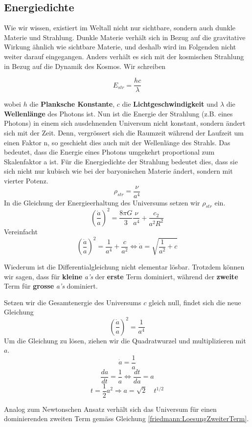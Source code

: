 \begin{refsection}
\subsection*{Energiedichte}
Wie wir wissen, existiert im Weltall nicht nur sichtbare, sondern auch dunkle Materie und Strahlung. Dunkle Materie verhält sich in Bezug auf die gravitative Wirkung ähnlich wie sichtbare Materie, und deshalb wird im Folgenden nicht weiter darauf eingegangen.
Anders verhält es sich mit der kosmischen Strahlung in Bezug auf die Dynamik des Kosmos. Wir schreiben


\[ E_{str} = \frac{h c}{\lambda} \]

wobei $h$ die \textbf{Planksche Konstante}, $c$ die \textbf{Lichtgeschwindigkeit} und $\lambda$ die \textbf{Wellenlänge} des Photons ist.
Nun ist die Energie der Strahlung (z.B. eines Photons) in einem sich ausdehnenden Universum nicht konstant, sondern ändert sich mit der Zeit. 
Denn, vergrössert sich die Raumzeit während der Laufzeit um einen Faktor n, so geschieht dies auch mit der Wellenlänge des Strahls.
Das bedeutet, dass die Energie eines Photons umgekehrt proportional zum Skalenfaktor a ist. Für die Energiedichte der Strahlung bedeutet dies, dass sie sich nicht nur kubisch wie bei der baryonischen Materie ändert, sondern mit vierter Potenz.
\begin{equation}
\rho_{str} = \frac{\nu}{a^4}
\end{equation}
In die Gleichung der Energieerhaltung des Universums setzen wir $\rho_{str}$ ein.
\[
\left(\frac{\dot{a}}{a} \right)^2 = \frac{8 \pi G}{3} \frac{\nu}{a^4} + \frac{c_2}{a^2 R^2}
\]
Vereinfacht
\[
\left(\frac{\dot{a}}{a} \right)^2 = \frac{1}{a^4} + \frac{c}{a^2} \Leftrightarrow \dot{a} = \sqrt{\frac{1}{a^2} + c}
\]

Wiederum ist die Differentialgleichung nicht elementar lösbar. Trotzdem können wir sagen, dass für \textbf{kleine} \textit{a's} der \textbf{erste} Term dominiert, während der \textbf{zweite} Term für \textbf{grosse} \textit{a's} dominiert.


Setzen wir die Gesamtenergie des Universums $c$ gleich null, findet sich die neue Gleichung	\[\left(\frac{\dot{a}}{a} \right)^2 = \frac{1}{a^4}\]
Um die Gleichung zu lösen, ziehen wir die Quadratwurzel und multiplizieren mit $a$.
\[ \dot{a} = \frac{1}{a} \]
\[\frac{da}{dt} =\frac{1}{a} \Leftrightarrow \frac{dt}{da} = a \]
\[ t = \frac{1}{2} a^{2} \Rightarrow a = \sqrt{2} \quad t^{1/2} \]

Analog zum Newtonschen Ansatz verhält sich das Universum für einen dominierenden zweiten Term gemäss Gleichung \ref{friedmann:LoesungZweiterTerm}.



\end{refsection}
